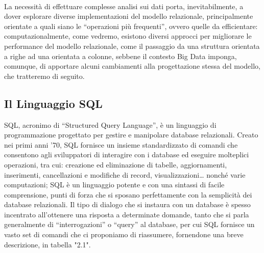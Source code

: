 \documentclass[a4paper,12pt]{report}
\begin{document}
\\[0ex]
La necessità di effettuare complesse analisi sui dati porta, inevitabilmente, a dover esplorare diverse implementazioni del modello relazionale, principalmente orientate a quali siano le “operazioni più frequenti”, ovvero quelle da efficientare: computazionalmente, come vedremo, esistono diversi approcci per migliorare le performance del modello relazionale, come il passaggio da una struttura orientata a righe ad una orientata a colonne, sebbene il contesto Big Data imponga, comunque, di apportare alcuni cambiamenti alla progettazione stessa del modello, che tratteremo di seguito.

\subsection{Il Linguaggio SQL}
SQL, acronimo di “Structured Query Language”, è un linguaggio di programmazione progettato per gestire e manipolare database relazionali. Creato nei primi anni '70, SQL fornisce un insieme standardizzato di comandi che consentono agli sviluppatori di interagire con i database ed eseguire molteplici operazioni, tra cui: creazione ed eliminazione di tabelle, aggiornamenti, inserimenti, cancellazioni e modifiche di record, visualizzazioni… nonché varie computazioni; SQL è un linguaggio potente e con una sintassi di facile comprensione, punti di forza che si sposano perfettamente con la semplicità dei database relazionali. Il tipo di dialogo che si instaura con un database è spesso incentrato all’ottenere una risposta a determinate domande, tanto che si parla generalmente di “interrogazioni” o “query” al database, per cui SQL fornisce un vasto set di comandi che ci proponiamo di riassumere, fornendone una breve descrizione, in tabella "2.1".
\end{document}
